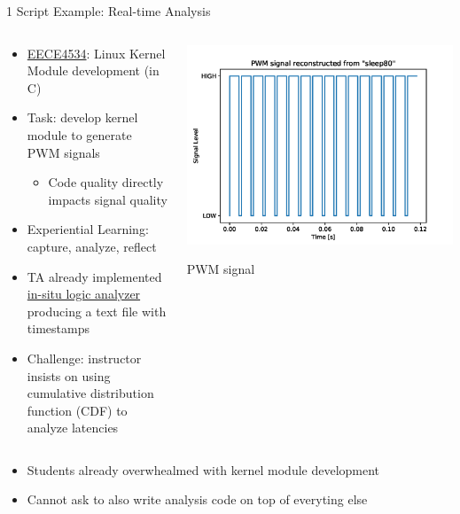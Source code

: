 \documentclass[xcolor=dvipsnames, aspectratio=169]{beamer}
\begin{document}
\begin{frame}{1 Script Example: Real-time Analysis}
  \begin{columns}[T]
    \begin{column}{0.6\textwidth}
      \begin{itemize}
        \item \href{https://neu-ece-4534.github.io}{EECE4534}: Linux Kernel Module development (in C)
        \item Task: develop kernel module to generate PWM signals
        \begin{itemize}
          \item Code quality directly impacts signal quality
        \end{itemize}
        \item Experiential Learning: capture,  analyze, reflect
        \item TA already implemented \href{https://neu-ece-4534.github.io/pulsecap.html}{in-situ logic analyzer} producing a text file with timestamps
        \item Challenge: instructor insists on using cumulative distribution function (CDF) to analyze latencies  
      \end{itemize}
    \end{column}
    
    \begin{column}{0.35\textwidth}
      \includegraphics[width=\textwidth]{images/edgeutil.png}
      \tiny\centerline{PWM signal}
    \end{column}
  \end{columns}

  \begin{alertbox}
    \begin{itemize}
      \item Students already overwhealmed with kernel module development
      \item Cannot ask to also write analysis code on top of everyting else
    \end{itemize}
  \end{alertbox}
\end{frame}
\end{document}
